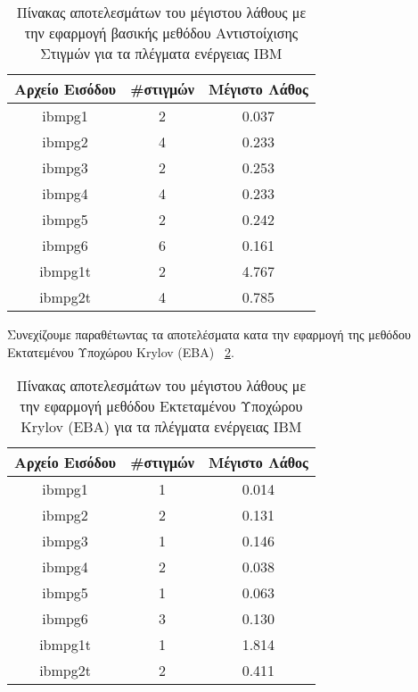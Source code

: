 \begin{table}[h!]
\centering
 \begin{tabular}{||c | c | c||} 
 \hline
 Αρχείο Εισόδου & \textlatin{\#}στιγμών & Μέγιστο Λάθος \\ [0.5ex] 
 \hline\hline
 \textlatin{ibmpg1} & 2 & 0.037 \\ 
 \hline
 \textlatin{ibmpg2} & 4 & 0.233 \\
 \hline
 \textlatin{ibmpg3} & 2 & 0.253 \\
 \hline
 \textlatin{ibmpg4} & 4 & 0.233 \\
 \hline
 \textlatin{ibmpg5} & 2 & 0.242 \\
 \hline
 \textlatin{ibmpg6} & 6 & 0.161 \\
 \hline
 \textlatin{ibmpg1t} & 2 & 4.767 \\
 \hline
 \textlatin{ibmpg2t} & 4 & 0.785 \\
 \hline
\end{tabular}
\caption{Πίνακας αποτελεσμάτων του μέγιστου λάθους με την εφαρμογή βασικής μεθόδου Αντιστοίχισης Στιγμών για τα πλέγματα ενέργειας \textlatin{IBM}}
\label{table:BasicMM}
\end{table}



Συνεχίζουμε παραθέτωντας τα αποτελέσματα κατα την εφαρμογή της μεθόδου Εκτατεμένου Υποχώρου \textlatin{Krylov} (\textlatin{EBA}) ~\ref{table:ResultsEBAMaxError}.

\begin{table}[h!]
\centering
 \begin{tabular}{||c | c | c||} 
 \hline
 Αρχείο Εισόδου & \textlatin{\#}στιγμών & Μέγιστο Λάθος \\ [0.5ex] 
 \hline\hline
 \textlatin{ibmpg1} & 1 & 0.014 \\ 
 \hline
 \textlatin{ibmpg2} & 2 & 0.131 \\
 \hline
 \textlatin{ibmpg3} & 1 & 0.146 \\
 \hline
 \textlatin{ibmpg4} & 2 & 0.038 \\
 \hline
 \textlatin{ibmpg5} & 1 & 0.063 \\
 \hline
 \textlatin{ibmpg6} & 3 & 0.130 \\
 \hline
 \textlatin{ibmpg1t} & 1 & 1.814 \\
 \hline
 \textlatin{ibmpg2t} & 2 & 0.411 \\
 \hline
\end{tabular}
\caption{Πίνακας αποτελεσμάτων του μέγιστου λάθους με την εφαρμογή μεθόδου Εκτεταμένου Υποχώρου \textlatin{Krylov} (\textlatin{EBA}) για τα πλέγματα ενέργειας \textlatin{IBM}}
\label{table:ResultsEBAMaxError}
\end{table}

